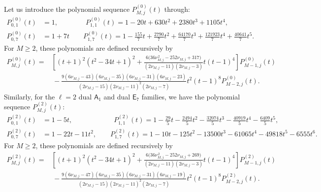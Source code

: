 \documentclass[11pt]{article}
\newcommand\be{\begin{equation}}
\newcommand\ee{\end{equation}}
\newcommand\mA{{\mathsf A}}
\newcommand\mE{{\mathsf E}}
\begin{document}
Let us introduce the polynomial sequence
\(P^{(0)}_{M,j}(t)\) through:
\be
\begin{aligned}
 P^{(0)}_{0,1}(t)
   &=1,
 \qquad\qquad P^{(0)}_{1,1}(t)
   =1-20t+630t^2+2380t^3+1105t^4,
 \\[2mm]
 P^{(0)}_{0,7}(t)&=1+7t
 \qquad
 P^{(0)}_{1,7}(t)
   =1-\frac{155}{7}t+\frac{2790}{7}t^2
     +\frac{64170}{7}t^3+\frac{121923}{7}t^4
     +\frac{40641}{7}t^5 .
\end{aligned}
\label{thetaPn_source_poly_initial}
\ee
For \(M\geq 2\), these polynomials are defined recursively by
\be
\begin{aligned}
 P^{(0)}_{M,j}(t)
 ={}&
 \left[
 (t+1)^2(t^2-34t+1)^2
 +\frac{
 6\bigl(36\nu_{M,j}^{\,2}-252\nu_{M,j}+317\bigr)
 }{
 (2\nu_{M,j}-11)(2\nu_{M,j}-3)
 }
 t(t-1)^4
 \right]
 P^{(0)}_{M-1,j}(t)
 \\[1mm]
 &\,
 -\frac{
 9(6\nu_{M,j}-43)(6\nu_{M,j}-35)
  (6\nu_{M,j}-31)(6\nu_{M,j}-23)
 }{
 (2\nu_{M,j}-15)(2\nu_{M,j}-11)^2
 (2\nu_{M,j}-7)
 }
 t^2(t-1)^8
 P^{(0)}_{M-2,j}(t).
\end{aligned}
\label{thetaPn_source_poly_recursion}
\ee
Similarly, for the \(\ell=2\) dual \(\mA_1\) and dual \(\mE_7\) families, we have
the polynomial sequence \(P^{(2)}_{M,j}(t)\):
\be
\begin{aligned}
 P^{(2)}_{0,1}(t)
   &=1-5t,
 \qquad\qquad\qquad
 P^{(2)}_{1,1}(t)
   =1-\frac{29}{5}t-\frac{2494}{5}t^2
     -\frac{32074}{5}t^3-\frac{40919}{5}t^4
     -\frac{6409}{5}t^5,
 \\[2mm]
 P^{(2)}_{0,7}(t)
   &=1-22t-11t^2, \qquad
 P^{(2)}_{1,7}(t)
   =1-10t-125t^2-13500t^3-61065t^4
     -49818t^5-6555t^6 .
\end{aligned}
\label{thetaPn_dual_poly_initial}
\ee
For \(M\geq 2\), these polynomials are defined recursively by
\be
\begin{aligned}
 P^{(2)}_{M,j}(t)
 ={}&
 \left[
 (t+1)^2(t^2-34t+1)^2
 +\frac{
 6\bigl(36\nu_{M,j}^{\,2}-252\nu_{M,j}+269\bigr)
 }{
 (2\nu_{M,j}-11)(2\nu_{M,j}-3)
 }
 t(t-1)^4
 \right]
 P^{(2)}_{M-1,j}(t)
 \\[1mm]
 &\,
 -\frac{
 9(6\nu_{M,j}-47)(6\nu_{M,j}-35)
  (6\nu_{M,j}-31)(6\nu_{M,j}-19)
 }{
 (2\nu_{M,j}-15)(2\nu_{M,j}-11)^2
 (2\nu_{M,j}-7)
 }
 t^2(t-1)^8
 P^{(2)}_{M-2,j}(t).
\end{aligned}
\label{thetaPn_dual_poly_recursion}
\ee
\end{document}
